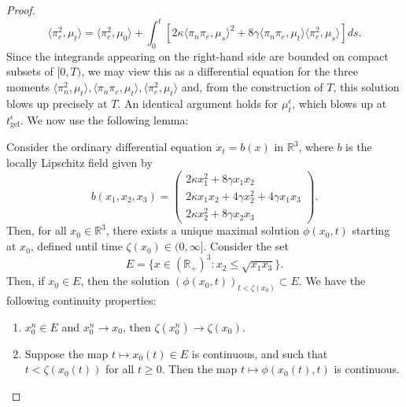 \begin{proof}
\begin{equation}
    \langle \pi_e^2, \mu_t\rangle =
    \langle \pi_e^2, \mu_0\rangle + \int_0^t \left[2\kappa\langle \pi_n\pi_e, \mu_s\rangle^2+8\gamma\langle \pi_n\pi_e, \mu_t\rangle\langle\pi_e^2, \mu_s \rangle \right] ds.
\end{equation} Since the integrands appearing on the right-hand side are bounded on compact subsets of $[0,T)$, we may view this as a differential equation for the three moments $\langle \pi_n^2, \mu_t\rangle, \langle \pi_n \pi_e, \mu_t\rangle, \langle \pi_e^2, \mu_t\rangle$ and, from the construction of $T$, this solution blows up precisely at $T$. An identical argument holds for $\mu^\epsilon_t$, which blows up at $t^\epsilon_\mathrm{gel}$. We now use the following lemma:
\begin{lemma}\label{lemma: ODE considerations} Consider the ordinary differential equation $\dot{x}_t=b(x)$ in $\mathbb{R}^3$, where $b$ is the locally Lipschitz field given by \begin{equation} \label{eq: system of ODEs} b(x_1,x_2,x_3)=\begin{pmatrix}2\kappa x_1^2+8\gamma x_1x_2 \\ 2\kappa x_1x_2+4\gamma x_2^2+4\gamma x_1x_3 \\ 2\kappa x_2^2 + 8\gamma x_2x_3 \end{pmatrix}. \end{equation} Then, for all $x_0\in \mathbb{R}^3$, there exists a unique maximal solution $\phi(x_0, t)$ starting at $x_0$, defined until time $\zeta(x_0)\in (0, \infty]$. Consider the set \begin{equation} E=\{x\in (\mathbb{R}_+)^3: x_2\le \sqrt{x_1x_3}\}.\end{equation} Then, if $x_0 \in E$, then the solution $(\phi(x_0,t))_{t<\zeta(x_0)} \subset E$. We have the following continuity properties: \begin{enumerate}[label=\roman{*}).] \item $x^n_0 \in E$ and $x^n_0 \rightarrow x_0$, then $\zeta(x^n_0)\rightarrow \zeta(x_0).$ \item Suppose the map $t\mapsto x_0(t) \in E$ is continuous, and such that $t<\zeta(x_0(t))$ for all $t\ge 0.$ Then the map $t\mapsto \phi(x_0(t), t)$ is continuous.  \end{enumerate} \end{lemma} 


\end{proof}
